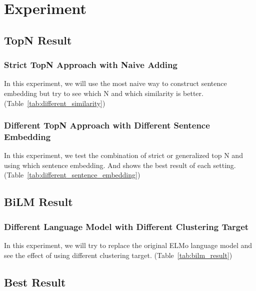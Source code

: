 \section{Experiment}
\label{sec:experiment}

\subsection*{TopN Result}

\subsubsection*{Strict TopN Approach with Naive Adding}

In this experiment, we will use the most naive way to construct sentence embedding but try to see which N and which similarity is better. (Table~\ref{tab:different_similarity})




\subsubsection*{Different TopN Approach with Different Sentence Embedding}

In this experiment, we test the combination of strict or generalized top N and using which sentence embedding. And shows the best result of each setting. (Table~\ref{tab:different_sentence_embedding})



\subsection*{BiLM Result}

\subsubsection*{Different Language Model with Different Clustering Target}

In this experiment, we will try to replace the original ELMo language model and see the effect of using different clustering target. (Table~\ref{tab:bilm_result})



\subsection*{Best Result}

